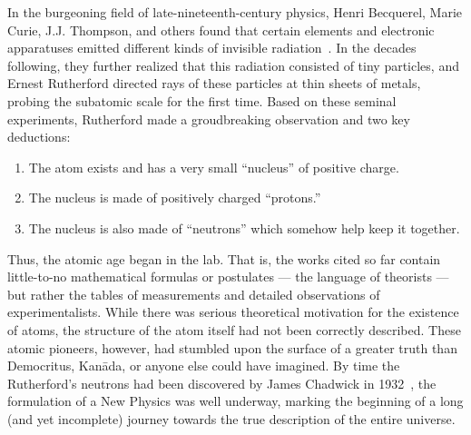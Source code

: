 \begin{dissertationintroduction}
In the burgeoning field of late-nineteenth-century physics, Henri Becquerel, Marie Curie, J.J. Thompson, and others found that certain elements and electronic apparatuses emitted different kinds of invisible radiation~\cite{Becquerel, Curie, RADVANYI2017544, Thompson}. 
In the decades following, they further realized that this radiation consisted of tiny particles\footnotemark{}, and Ernest Rutherford directed rays of these particles at thin sheets of metals, probing the subatomic scale for the first time. 
Based on these seminal experiments, Rutherford made a groudbreaking observation and two key deductions: %
\begin{enumerate}
    \item The atom exists\footnotemark{} and has a very small ``nucleus'' of positive charge.
    \item The nucleus is made of positively charged ``protons.''
    \item The nucleus is also made of ``neutrons'' which somehow help keep it together.
\end{enumerate}
Thus, the atomic age began in the lab. 
That is, the works cited so far contain little-to-no mathematical formulas or postulates --- the language of theorists --- but rather the tables of measurements and detailed observations of experimentalists. 
While there was serious theoretical motivation for the existence of atoms\footnotemark{}, the structure of the atom itself had not been correctly described. 
These atomic pioneers, however, had stumbled upon the surface of a greater truth than Democritus, Kan\=ada, or anyone else could have imagined. 
By time the Rutherford's neutrons had been discovered by James Chadwick in 1932~\cite{Chadwick1932}, the formulation of a New Physics was well underway, marking the beginning of a long (and yet incomplete) journey towards the true description of the entire universe. 


\end{dissertationintroduction}
